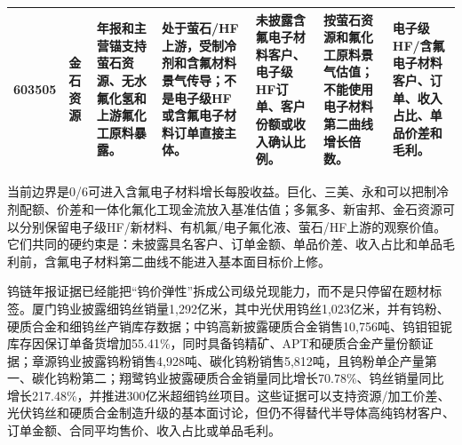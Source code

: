 \begin{exhibitbox}[含氟电子材料边界]
\begin{tabularx}{\exhibitboxwidth}{L{0.85cm} L{1.15cm} X X X X X}
603505 & 金石资源 & 年报和主营锚支持萤石资源、无水氟化氢和上游氟化工原料暴露。 & 处于萤石/HF上游，受制冷剂和含氟材料景气传导；不是电子级HF或含氟电子材料订单直接主体。 & 未披露含氟电子材料客户、电子级HF订单、客户份额或收入确认比例。 & 按萤石资源和氟化工原料景气估值；不能使用电子材料第二曲线增长倍数。 & 电子级HF/含氟电子材料客户、订单、收入占比、单品价差和毛利。 \\
\bottomrule
\end{tabularx}
\end{exhibitbox}

当前边界是0/6可进入含氟电子材料增长每股收益。巨化、三美、永和可以把制冷剂配额、价差和一体化氟化工现金流放入基准估值；多氟多、新宙邦、金石资源可以分别保留电子级HF/新材料、有机氟/电子氟化液、萤石/HF上游的观察价值。它们共同的硬约束是：未披露具名客户、订单金额、单品价差、收入占比和单品毛利前，含氟电子材料第二曲线不能进入基本面目标价上修。


钨链年报证据已经能把“钨价弹性”拆成公司级兑现能力，而不是只停留在题材标签。厦门钨业披露细钨丝销量1,292亿米，其中光伏用钨丝1,023亿米，并有钨粉、硬质合金和细钨丝产销库存数据；中钨高新披露硬质合金销售10,756吨、钨钼钽铌库存因保订单备货增加55.41\%，同时具备钨精矿、APT和硬质合金产量份额证据；章源钨业披露钨粉销售4,928吨、碳化钨粉销售5,812吨，且钨粉单企产量第一、碳化钨粉第二；翔鹭钨业披露硬质合金销量同比增长70.78\%、钨丝销量同比增长217.48\%，并推进300亿米超细钨丝项目。这些证据可以支持资源/加工价差、光伏钨丝和硬质合金制造升级的基本面讨论，但仍不得替代半导体高纯钨材客户、订单金额、合同平均售价、收入占比或单品毛利。

